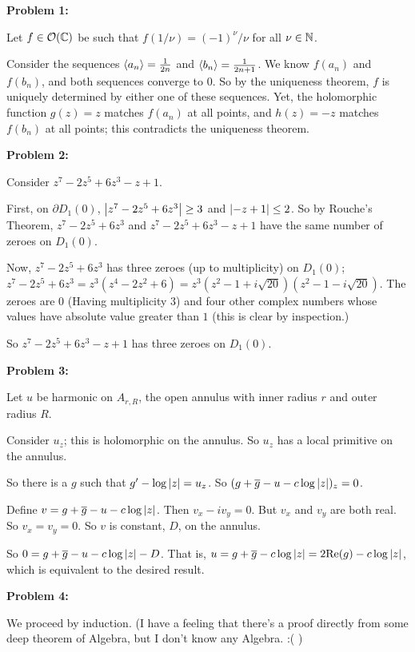 \documentclass[a4paper,12pt]{article}
\begin{document}
{\bf Problem 1:}

Let $f \in \mathcal{O}(\mathbb{C})$ be such that $f(1/\nu) = (-1)^\nu/\nu$ for all $\nu \in \mathbb{N}$. 

Consider the sequences $\left\langle a_n \right\rangle = \frac{1}{2n}$ and $\left\langle b_n \right\rangle = \frac{1}{2n+1}$. We know $f(a_n)$ and $f(b_n)$, and both sequences converge to $0$. So by the uniqueness theorem, $f$ is uniquely determined by either one of these sequences. Yet, the holomorphic function $g(z) = z$ matches $f(a_n)$ at all points, and $h(z)= -z$ matches $f(b_n)$ at all points; this contradicts the uniqueness theorem.

\shunt

{\bf Problem 2:}

Consider $z^7 -2z^5+6z^3-z+1$.

First, on $\partial D_1(0)$, $\left\lvert z^7-2z^5+6z^3 \right\rvert \geq 3$ and $\left\lvert -z+1 \right\rvert \leq 2$. So by Rouche's Theorem, $z^7-2z^5+6z^3$ and $z^7 -2z^5+6z^3-z+1$ have the same number of zeroes on $D_1(0)$.

Now, $z^7-2z^5+6z^3$ has three zeroes (up to multiplicity) on $D_1(0)$; $z^7-2z^5+6z^3 = z^3(z^4-2z^2+6) = z^3(z^2-1+i\sqrt{20}) (z^2-1-i\sqrt{20})$. The zeroes are $0$ (Having multiplicity $3$) and four other complex numbers whose values have absolute value greater than $1$ (this is clear by inspection.)

So $z^7 -2z^5+6z^3-z+1$ has three zeroes on $D_1(0)$.

\shunt

{\bf Problem 3:}

Let $u$ be harmonic on $A_{r,R}$, the open annulus with inner radius $r$ and outer radius $R$.



Consider $u_z$; this is holomorphic on the annulus. So $u_z$ has a local primitive on the annulus.

So there is a $g$ such that $g' - \log{\left\lvert z \right\rvert} = u_z$. So $(g + \overline{g} - u - c\log{\left\lvert z \right\rvert})_z  = 0$.

Define $v = g + \overline{g} - u - c\log{\left\lvert z \right\rvert}$. Then $v_x - iv_y = 0$. But $v_x$ and $v_y$ are both real. So $v_x = v_y = 0$. So $v$ is constant, $D$, on the annulus.

So $0 = g + \overline{g} - u - c\log{\left\lvert z \right\rvert} - D$. That is, $u = g + \overline{g} - c\log{\left\lvert z \right\rvert} = 2\text{Re}(g) - c\log{\left\lvert z \right\rvert}$, which is equivalent to the desired result. 
\shunt

{\bf Problem 4:}

We proceed by induction. (I have a feeling that there's a proof directly from some deep theorem of Algebra, but I don't know any Algebra. :( )
\end{document}
